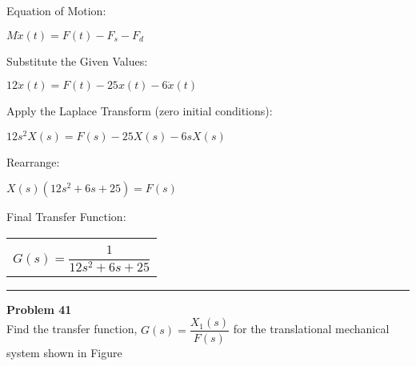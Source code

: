 \documentclass[11pt,letterpaper]{article}
\begin{document}
Equation of Motion:\\
\begin{center}
	$M\ddot{x}(t)=F(t)-F_{s}-F_{d}$\\[12pt]
\end{center}
Substitute the Given Values:\\
\begin{center}
	$12\ddot{x}(t)=F(t)-25x(t)-6\dot{x}(t)$\\
\end{center}
Apply the Laplace Transform (zero initial conditions):\\
\begin{center}
	$12s^2X(s)=F(s)-25X(s)-6sX(s)$\\[12pt]
\end{center}
Rearrange:\\
\begin{center}
	$X(s)(12s^2+6s+25)=F(s)$\\
\end{center}
Final Transfer Function:\\
\begin{center}
	\begin{tabular}{|c|}
		\hline \\
		$G(s)=\dfrac{1}{12s^2+6s+25}$\\[12pt]
		\hline
	\end{tabular}	
\end{center}

\clearpage

\rule{\textwidth}{1pt}
\textbf{Problem 41}\\
Find the transfer function, $G(s)=\dfrac{X_1(s)}{F(s)}$ for the translational mechanical system shown in Figure\\
\end{document}
